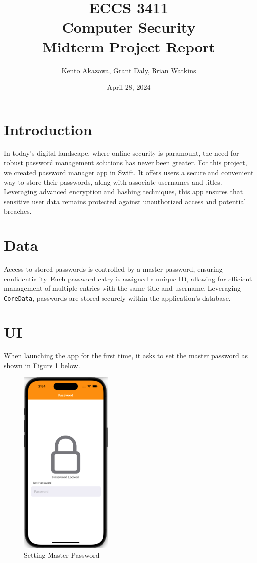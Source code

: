 \documentclass[10pt, titlepage]{article}
\title{\textbf{ECCS 3411\\Computer Security}\\Midterm Project Report}
\author{Kento Akazawa, Grant Daly, Brian Watkins}
\date{April 28, 2024}
\begin{document}
\maketitle
\newpage

\section*{Introduction}
In today's digital landscape, where online security is paramount, the need for robust password management solutions has never been greater. For this project, we created password manager app in Swift. It offers users a secure and convenient way to store their passwords, along with associate usernames and titles. Leveraging advanced encryption and hashing techniques, this app ensures that sensitive user data remains protected against unauthorized access and potential breaches.

\section*{Data}
Access to stored passwords is controlled by a master password, ensuring confidentiality. Each password entry is assigned a unique ID, allowing for efficient management of multiple entries with the same title and username. Leveraging \texttt{CoreData}, passwords are stored securely within the application's database. 

\section*{UI}
When launching the app for the first time, it asks to set the master password as shown in Figure \ref{fig:set_pw} below. 
\begin{figure}[H]
	\centering
	\vspace{-0.25em}
	\includegraphics[width=0.4\textwidth]{img/set_pw}
	\vspace{-0.75em}
	\caption{Setting Master Password}
	\label{fig:set_pw}
	\vspace{-0.75em}
\end{figure}
\end{document}
